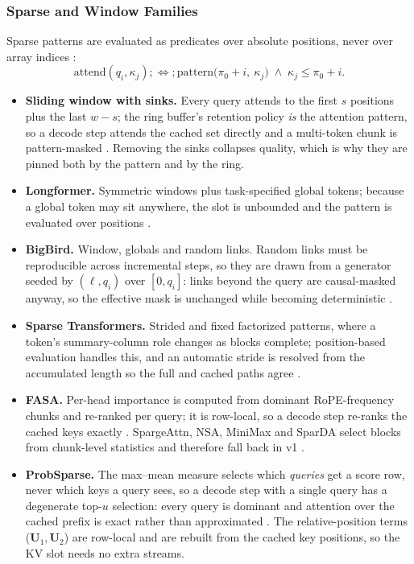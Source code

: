 \subsubsection{Sparse and Window Families}

Sparse patterns are evaluated as predicates over absolute positions, never over array indices \citep{child_sparse_transformer_2019}:
\[
\text{attend}(q_i,\kappa_j) ;\Longleftrightarrow; \text{pattern}\big(\pi_0+i,\ \kappa_j\big) \;\wedge\; \kappa_j \le \pi_0+i .
\]

\begin{itemize}[leftmargin=*]
    \item \textbf{Sliding window with sinks.} Every query attends to the first $s$ positions plus the last $w-s$; the ring buffer's retention policy \emph{is} the attention pattern, so a decode step attends the cached set directly and a multi-token chunk is pattern-masked \citep{jolicoeur_sliding_window_2026,xiao_streaming_sinks_2024}. Removing the sinks collapses quality, which is why they are pinned both by the pattern and by the ring.
    \item \textbf{Longformer.} Symmetric windows plus task-specified global tokens; because a global token may sit anywhere, the slot is unbounded and the pattern is evaluated over positions \citep{beltagy_longformer_2020}.
    \item \textbf{BigBird.} Window, globals and random links. Random links must be reproducible across incremental steps, so they are drawn from a generator seeded by $(\ell, q_i)$ over $[0, q_i]$: links beyond the query are causal-masked anyway, so the effective mask is unchanged while becoming deterministic \citep{zaheer_bigbird_2020}.
    \item \textbf{Sparse Transformers.} Strided and fixed factorized patterns, where a token's summary-column role changes as blocks complete; position-based evaluation handles this, and an automatic stride is resolved from the accumulated length so the full and cached paths agree \citep{child_sparse_transformer_2019}.
    \item \textbf{FASA.} Per-head importance is computed from dominant RoPE-frequency chunks and re-ranked per query; it is row-local, so a decode step re-ranks the cached keys exactly \citep{wang_fasa_2026}. SpargeAttn, NSA, MiniMax and SparDA select blocks from chunk-level statistics and therefore fall back in v1 \citep{zhang_spargeattn_2025,yuan_nsa_2025,lai_minimax_2026,fu_sparda_2026}.
    \item \textbf{ProbSparse.} The max--mean measure selects which \emph{queries} get a score row, never which keys a query sees, so a decode step with a single query has a degenerate top-$u$ selection: every query is dominant and attention over the cached prefix is exact rather than approximated \citep{wu_deep_sparse_conformer_2022,zhou_informer_2021}. The relative-position terms ($\mathbf{U}_1,\mathbf{U}_2$) are row-local and are rebuilt from the cached key positions, so the KV slot needs no extra streams.
\end{itemize}

